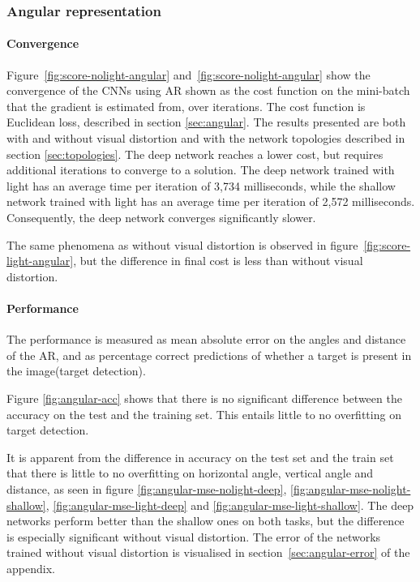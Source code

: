 

\subsubsection{Angular representation}
\paragraph{Convergence}
Figure~\ref{fig:score-nolight-angular} and~\ref{fig:score-nolight-angular} show the convergence of the CNNs using AR shown as the cost function on the mini-batch that the gradient is estimated from, over iterations. The cost function is Euclidean loss, described in section \ref{sec:angular}.
The results presented are both with and without visual distortion and with the network topologies described in section \ref{sec:topologies}. The deep network reaches a lower cost, but requires additional iterations to converge to a solution. The deep network trained with light has an average time per iteration of 3,734 milliseconds, while the shallow network trained with light has an average time per iteration of 2,572 milliseconds. Consequently, the deep network converges significantly slower.

The same phenomena as without visual distortion is observed in figure~\ref{fig:score-light-angular}, but the difference in final cost is less than without visual distortion.





\paragraph{Performance}
\label{sec:results-angular-representation}
The performance is measured as mean absolute error on the angles and distance of the AR, and as percentage correct predictions of whether a target is present in the image(target detection).

Figure \ref{fig:angular-acc} shows that there is no significant difference between the accuracy on the test and the training set. This entails little to no overfitting on target detection.

It is apparent from the difference in accuracy on the test set and the train set that there is little to no overfitting on horizontal angle, vertical angle and distance, as seen in figure \ref{fig:angular-mse-nolight-deep}, \ref{fig:angular-mse-nolight-shallow}, \ref{fig:angular-mse-light-deep} and \ref{fig:angular-mse-light-shallow}. The deep networks perform better than the shallow ones on both tasks, but the difference is especially significant without visual distortion. The error of the networks trained without visual distortion is visualised in section~\ref{sec:angular-error} of the appendix.

